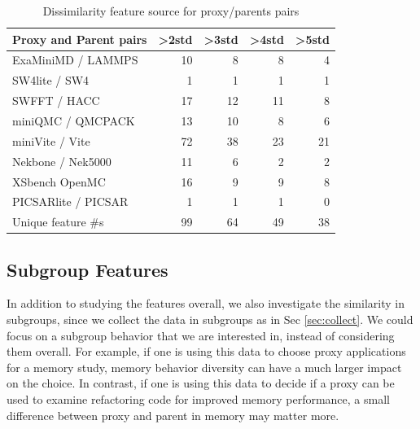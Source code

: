 \begin{table}[t]
\caption{Dissimilarity feature source for proxy/parents pairs}
\label{tab:Dissimilarity}
\centering
\begin{tabular}{lrrrr}%
\toprule
\textbf{Proxy and Parent pairs}               & \textbf{\textgreater{}2std} & \textbf{\textgreater{}3std} & \textbf{\textgreater{}4std} & \textbf{\textgreater{}5std} \\ \midrule
ExaMiniMD / LAMMPS                            & 10                          & 8                           & 8                           & 4                           \\ 
SW4lite / SW4                                 & 1                           & 1                           & 1                           & 1                           \\ 
SWFFT / HACC                                  & 17                          & 12                          & 11                          & 8                           \\ 
miniQMC / QMCPACK                             & 13                          & 10                          & 8                           & 6                           \\ 
miniVite / Vite                               & 72                          & 38                          & 23                          & 21                          \\ 
Nekbone / Nek5000                             & 11                          & 6                           & 2                           & 2                           \\ 
XSbench OpenMC                                & 16                          & 9                           & 9                           & 8                           \\ 
PICSARlite / PICSAR                           & 1                           & 1                           & 1                           & 0                           \\ 
Unique feature \#s & 99                          & 64                          & 49                          & 38                          \\ \bottomrule
\end{tabular}

\end{table}


\subsection{Subgroup Features}
\label{sec:subgroup}
In addition to studying the features overall, we also investigate the similarity in subgroups, since we collect the data in subgroups as in Sec \ref{sec:collect}. We could focus on a subgroup behavior that we are interested in, instead of considering them overall. 
For example, if one is using this data to choose proxy applications for a memory study, memory behavior diversity can have a much larger impact on the choice. In contrast, if one is using this data to decide if a proxy can be used to examine refactoring code for improved memory performance, a small difference between proxy and parent in memory may matter more. 


